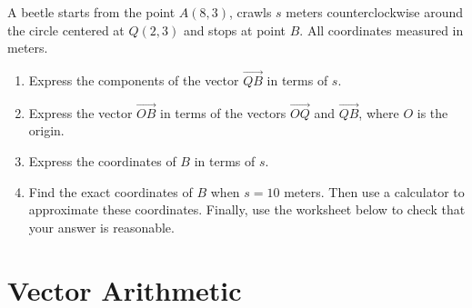 \documentclass{ximera}
\begin{document}
\begin{question}  \label{QDfg554egsE}
A beetle starts from the point $A(8,3)$, crawls $s$ meters counterclockwise around the circle centered at $Q(2,3)$ and stops at point $B$. All coordinates measured in meters.

\begin{enumerate}
\item Express the components of the vector $\overrightarrow{QB}$ in terms of $s$.

\item Express the vector $\overrightarrow{OB}$ in terms of the vectors $\overrightarrow{OQ}$ and $\overrightarrow{QB}$, where $O$ is the origin.

\item Express the coordinates of $B$ in terms of $s$.

\item Find the exact coordinates of $B$ when $s=10$ meters. Then use a calculator to approximate these coordinates. Finally, use the worksheet below to check that your answer is reasonable.
\end{enumerate}
\end{question}



\section{Vector Arithmetic}
\end{document}
